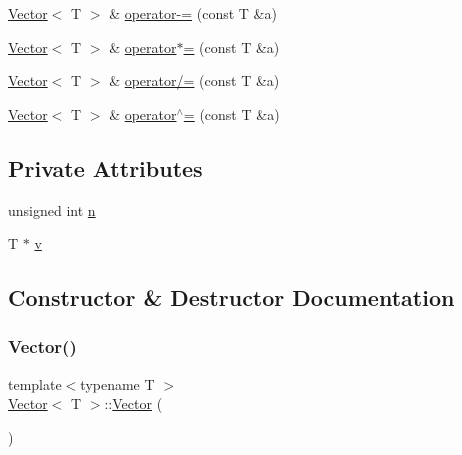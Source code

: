 \begin{DoxyCompactItemize}
\item 
\mbox{\hyperlink{classVector}{Vector}}$<$ T $>$ \& \mbox{\hyperlink{classVector_a7581aba7a67b45ff1b2848d37e00cfa1_a7581aba7a67b45ff1b2848d37e00cfa1}{operator-\/=}} (const T \&a)
\item 
\mbox{\hyperlink{classVector}{Vector}}$<$ T $>$ \& \mbox{\hyperlink{classVector_a02e9c5296c7ddb1a2047a8c80d93e0d5_a02e9c5296c7ddb1a2047a8c80d93e0d5}{operator$\ast$=}} (const T \&a)
\item 
\mbox{\hyperlink{classVector}{Vector}}$<$ T $>$ \& \mbox{\hyperlink{classVector_a358eca4649d02b3bbab359484eb93140_a358eca4649d02b3bbab359484eb93140}{operator/=}} (const T \&a)
\item 
\mbox{\hyperlink{classVector}{Vector}}$<$ T $>$ \& \mbox{\hyperlink{classVector_a6767000b5cbf4999aa301eb24a7b74fc_a6767000b5cbf4999aa301eb24a7b74fc}{operator$^\wedge$=}} (const T \&a)
\end{DoxyCompactItemize}
\subsection*{Private Attributes}
\begin{DoxyCompactItemize}
\item 
unsigned int \mbox{\hyperlink{classVector_adab11fd27ce9e960aa8612937e453786_adab11fd27ce9e960aa8612937e453786}{n}}
\item 
T $\ast$ \mbox{\hyperlink{classVector_ab72db1fed2b2310123729b1fd76d3446_ab72db1fed2b2310123729b1fd76d3446}{v}}
\end{DoxyCompactItemize}


\subsection{Constructor \& Destructor Documentation}
\mbox{\label{classVector_a39d6069675db4ecfc1ab81d440da759a_a39d6069675db4ecfc1ab81d440da759a}} 
\subsubsection{\texorpdfstring{Vector()}{Vector()}\hspace{0.1cm}{\footnotesize\ttfamily [1/5]}}
{\footnotesize\ttfamily template$<$typename T $>$ \\
\mbox{\hyperlink{classVector}{Vector}}$<$ T $>$\+::\mbox{\hyperlink{classVector}{Vector}} (\begin{DoxyParamCaption}{ }\end{DoxyParamCaption})}

